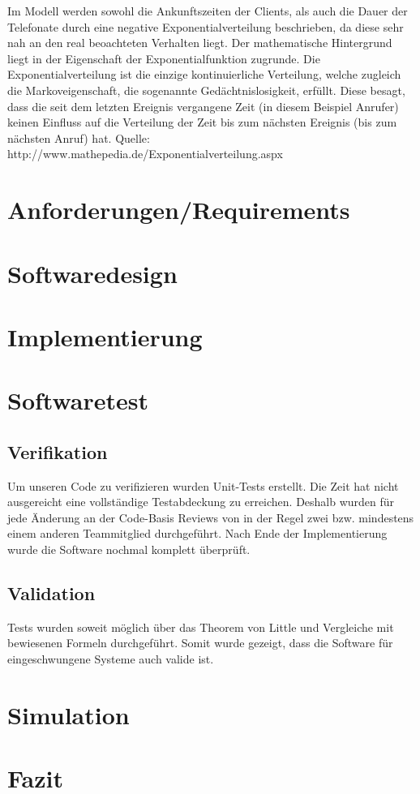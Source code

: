 Im Modell werden sowohl die Ankunftszeiten der Clients, als auch die Dauer der Telefonate durch eine negative Exponentialverteilung beschrieben, da diese sehr nah an den real beoachteten Verhalten liegt. Der mathematische Hintergrund liegt in der Eigenschaft der Exponentialfunktion zugrunde. Die Exponentialverteilung ist die einzige kontinuierliche Verteilung, welche zugleich die Markoveigenschaft, die sogenannte Gedächtnislosigkeit, erfüllt. Diese besagt, dass die seit dem letzten Ereignis vergangene Zeit (in diesem Beispiel Anrufer) keinen Einfluss auf die Verteilung der Zeit bis zum nächsten Ereignis (bis zum nächsten Anruf) hat. 
Quelle: http://www.mathepedia.de/Exponentialverteilung.aspx


\section{Anforderungen/Requirements}

\section{Softwaredesign}

\section{Implementierung}

\section{Softwaretest}

\subsection{Verifikation}

Um unseren Code zu verifizieren wurden Unit-Tests erstellt. Die Zeit hat nicht ausgereicht eine vollständige Testabdeckung zu erreichen. Deshalb wurden für jede Änderung an der Code-Basis Reviews von in der Regel zwei bzw. mindestens einem anderen Teammitglied durchgeführt. Nach Ende der Implementierung wurde die Software nochmal komplett überprüft.

\subsection{Validation}

Tests wurden soweit möglich über das Theorem von Little und Vergleiche mit bewiesenen Formeln durchgeführt. Somit wurde gezeigt,  
dass die Software für eingeschwungene Systeme auch valide ist.

\section{Simulation}

\section{Fazit}



